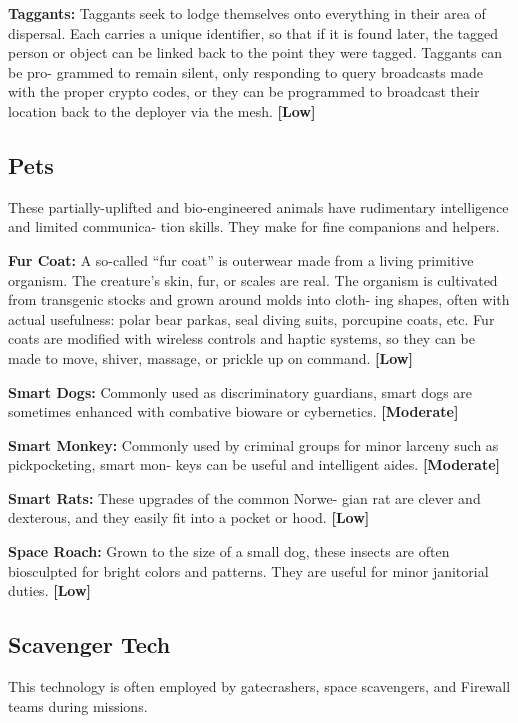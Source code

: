 \textbf{Taggants:} Taggants seek to lodge themselves onto 
everything in their area of dispersal. Each carries 
a unique identifier, so that if it is found later, the 
tagged person or object can be linked back to 
the point they were tagged. Taggants can be pro-
grammed to remain silent, only responding to query 
broadcasts made with the proper crypto codes, or 
they can be programmed to broadcast their location 
back to the deployer via the mesh. \textbf{[Low]}

\subsection{Pets}

These partially-uplifted and bio-engineered animals 
have rudimentary intelligence and limited communica-
tion skills. They make for fine companions and helpers.

\textbf{Fur Coat:} A so-called ``fur coat'' is outerwear made 
from a living primitive organism. The creature's skin, 
fur, or scales are real. The organism is cultivated from 
transgenic stocks and grown around molds into cloth-
ing shapes, often with actual usefulness: polar bear 
parkas, seal diving suits, porcupine coats, etc. Fur 
coats are modified with wireless controls and haptic 
systems, so they can be made to move, shiver, massage, 
or prickle up on command. \textbf{[Low]}

\textbf{Smart Dogs:} Commonly used as discriminatory 
guardians, smart dogs are sometimes enhanced with 
combative bioware or cybernetics. \textbf{[Moderate]}

\textbf{Smart Monkey:} Commonly used by criminal groups 
for minor larceny such as pickpocketing, smart mon-
keys can be useful and intelligent aides. \textbf{[Moderate]}

\textbf{Smart Rats:} These upgrades of the common Norwe-
gian rat are clever and dexterous, and they easily fit 
into a pocket or hood. \textbf{[Low]}

\textbf{Space Roach:} Grown to the size of a small dog, 
these insects are often biosculpted for bright colors 
and patterns. They are useful for minor janitorial 
duties. \textbf{[Low]}

\subsection{Scavenger Tech}

This technology is often employed by gatecrashers, 
space scavengers, and Firewall teams during missions.

